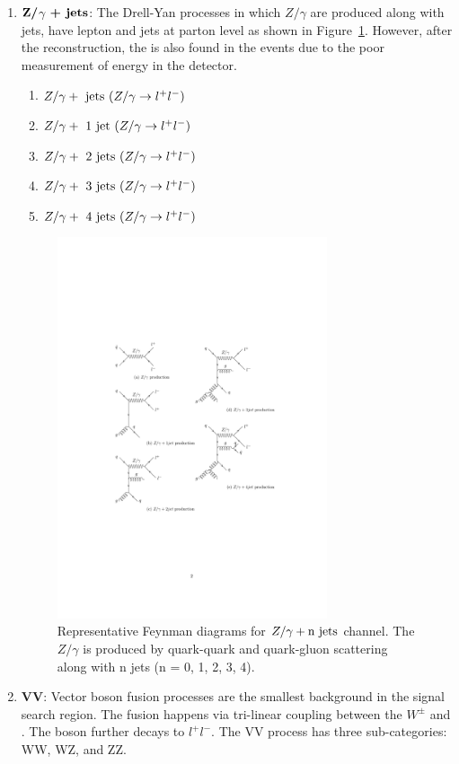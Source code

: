 \begin{enumerate}[leftmargin=*]
\item ${\bf{Z/}}$$\gamma$ ${\bf{+ jets}}$: The Drell-Yan processes in which 
	$Z/\gamma$ are produced along with jets, have lepton and jets at parton level as 
	shown in Figure~\ref{fig:feyn_diag_dyjet}. However, after the 
	reconstruction, the \MET is also found in the events due to the poor 
	measurement of energy in the detector.
	\begin{enumerate}[leftmargin=*]
  	\item $Z/\gamma +\rm{ jets   }(Z/\gamma \rightarrow l^+ l^-)$
  	\item $Z/\gamma +\rm{ 1 jet  }(Z/\gamma \rightarrow l^+ l^-)$
  	\item $Z/\gamma +\rm{ 2 jets }(Z/\gamma \rightarrow l^+ l^-)$
  	\item $Z/\gamma +\rm{ 3 jets }(Z/\gamma \rightarrow l^+ l^-)$
  	\item $Z/\gamma +\rm{ 4 jets }(Z/\gamma \rightarrow l^+ l^-)$
  	\end{enumerate}
	\begin{figure}
	\begin{center}
	\includegraphics[width=0.75\textwidth]{Image/FeynDiag/feyn_diag_dyjet.pdf}
	\caption{Representative Feynman diagrams for $ Z/\gamma + \rm{n jets}$ channel. 
	The $Z/\gamma$ is produced by quark-quark and quark-gluon scattering 
	along with n jets (n = 0, 1, 2, 3, 4).}
	\label{fig:feyn_diag_dyjet}
	\end{center}
	\end{figure}

\item {\bf{VV}}: Vector boson fusion processes are the smallest background in the signal 
	search region. The fusion happens via tri-linear coupling between the 
	$W^\pm$ and \PZ. The \PZ boson further decays to $l^+l^-$. The VV process has 
	three sub-categories: WW, WZ, and ZZ.
\end{enumerate}

